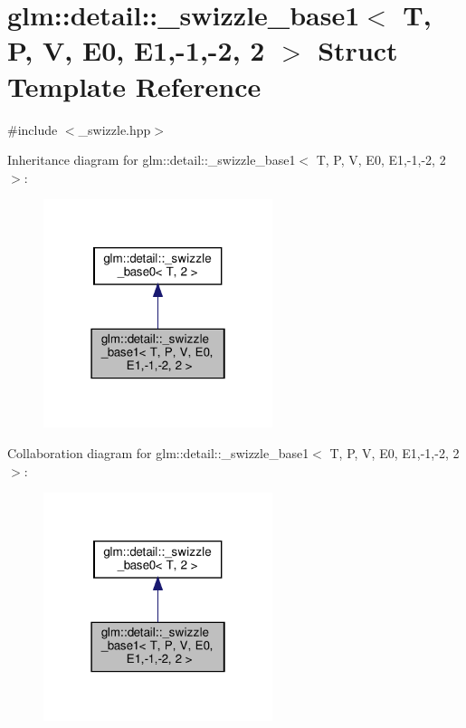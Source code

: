 \hypertarget{structglm_1_1detail_1_1__swizzle__base1_3_01_t_00_01_p_00_01_v_00_01_e0_00_01_e1_00-1_00-2_00_012_01_4}{}\section{glm\+:\+:detail\+:\+:\+\_\+swizzle\+\_\+base1$<$ T, P, V, E0, E1,-\/1,-\/2, 2 $>$ Struct Template Reference}
\label{structglm_1_1detail_1_1__swizzle__base1_3_01_t_00_01_p_00_01_v_00_01_e0_00_01_e1_00-1_00-2_00_012_01_4}


{\ttfamily \#include $<$\+\_\+swizzle.\+hpp$>$}



Inheritance diagram for glm\+:\+:detail\+:\+:\+\_\+swizzle\+\_\+base1$<$ T, P, V, E0, E1,-\/1,-\/2, 2 $>$\+:\nopagebreak
\begin{figure}[H]
\begin{center}
\leavevmode
\includegraphics[width=190pt]{structglm_1_1detail_1_1__swizzle__base1_3_01_t_00_01_p_00_01_v_00_01_e0_00_01_e1_00-1_00-2_00_012_01_4__inherit__graph}
\end{center}
\end{figure}


Collaboration diagram for glm\+:\+:detail\+:\+:\+\_\+swizzle\+\_\+base1$<$ T, P, V, E0, E1,-\/1,-\/2, 2 $>$\+:\nopagebreak
\begin{figure}[H]
\begin{center}
\leavevmode
\includegraphics[width=190pt]{structglm_1_1detail_1_1__swizzle__base1_3_01_t_00_01_p_00_01_v_00_01_e0_00_01_e1_00-1_00-2_00_012_01_4__coll__graph}
\end{center}
\end{figure}
